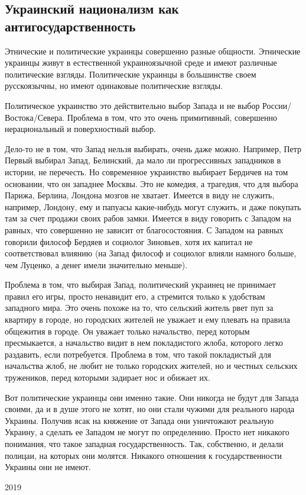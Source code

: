  
 
 

\subsection{Украинский национализм как антигосударственность}
\label{sec:10_11_2020.fb.denis_zharkih.4.ukr_nacionalizm}

Этнические и политические украинцы совершенно разные общности. Этнические
украинцы живут в естественной украиноязычной среде и имеют различные
политические взгляды. Политические украинцы в большинстве своем русскоязычны,
но имеют одинаковые политические взгляды.

Политическое украинство это действительно выбор Запада и не выбор
России/Востока/Севера. Проблема в том, что это очень примитивный, совершенно
нерациональный и поверхностный выбор.

Дело-то не в том, что Запад нельзя выбирать, очень даже можно. Например, Петр
Первый выбирал Запад, Белинский, да мало ли прогрессивных западников в истории,
не перечесть. Но современное украинство выбирает Бердичев на том основании, что
он западнее Москвы. Это не комедия, а трагедия, что для выбора Парижа, Берлина,
Лондона мозгов не хватает. Имеется в виду не служить, например, Лондону, ему и
папуасы какие-нибудь могут служить, и даже покупать там за счет продажи своих
рабов замки. Имеется в виду говорить с Западом на равных, что совершенно не
зависит от благосостояния. С Западом на равных говорили философ Бердяев и
социолог Зиновьев, хотя их капитал не соответствовал влиянию (на Запад философ
и социолог влияли намного больше, чем Луценко, а денег имели значительно
меньше).

Проблема в том, что выбирая Запад, политический украинец не принимает правил
его игры, просто ненавидит его, а стремится только к удобствам западного мира.
Это очень похоже на то, что сельский житель рвет пуп за квартиру в городе, но
городских жителей не уважает и ему плевать на правила общежития в городе. Он
уважает только начальство, перед которым пресмыкается, а начальство видит в нем
покладистого жлоба, которого легко раздавить, если потребуется. Проблема в том,
что такой покладистый для начальства жлоб, не любит не только городских
жителей, но и честных сельских тружеников, перед которыми задирает нос и
обижает их.

Вот политические украинцы они именно такие. Они никогда не будут для Запада
своими, да и в душе этого не хотят, но они стали чужими для реального народа
Украины. Получив ясак на княжение от Запада они уничтожают реальную Украину, а
сделать ее Западом не могут по определению. Просто нет никакого понимания, что
такое западная государственность. Так, собственно, и делали полицаи, на которых
они молятся. Никакого отношения к государственности Украины они не имеют.

2019
